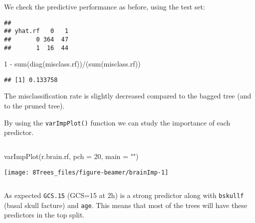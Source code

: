 \documentclass[
  10pt,
  ignorenonframetext,
]{beamer}
\newenvironment{Shaded}{\begin{snugshade}}{\end{snugshade}}
\newcommand{\AttributeTok}[1]{\textcolor[rgb]{0.77,0.63,0.00}{#1}}
\newcommand{\DecValTok}[1]{\textcolor[rgb]{0.00,0.00,0.81}{#1}}
\newcommand{\FunctionTok}[1]{\textcolor[rgb]{0.00,0.00,0.00}{#1}}
\newcommand{\NormalTok}[1]{#1}
\newcommand{\OtherTok}[1]{\textcolor[rgb]{0.56,0.35,0.01}{#1}}
\newcommand{\SpecialCharTok}[1]{\textcolor[rgb]{0.00,0.00,0.00}{#1}}
\newcommand{\StringTok}[1]{\textcolor[rgb]{0.31,0.60,0.02}{#1}}
\begin{document}
\begin{frame}[fragile]
We check the predictive performance as before, using the test set:

\vspace{2mm}

\scriptsize

\begin{Shaded}
\end{Shaded}

\begin{verbatim}
##        
## yhat.rf   0   1
##       0 364  47
##       1  16  44
\end{verbatim}

\begin{Shaded}
\begin{Highlighting}[]
\DecValTok{1} \SpecialCharTok{{-}} \FunctionTok{sum}\NormalTok{(}\FunctionTok{diag}\NormalTok{(misclass.rf))}\SpecialCharTok{/}\NormalTok{(}\FunctionTok{sum}\NormalTok{(misclass.rf))}
\end{Highlighting}
\end{Shaded}

\begin{verbatim}
## [1] 0.133758
\end{verbatim}

\normalsize

The misclassification rate is slightly decreased compared to the bagged
tree (and to the pruned tree).
\end{frame}

\begin{frame}[fragile]
By using the \texttt{varImpPlot()} function we can study the importance
of each predictor.

\(~\)

\scriptsize

\begin{Shaded}
\begin{Highlighting}[]
\FunctionTok{varImpPlot}\NormalTok{(r.brain.rf, }\AttributeTok{pch =} \DecValTok{20}\NormalTok{, }\AttributeTok{main =} \StringTok{""}\NormalTok{)}
\end{Highlighting}
\end{Shaded}

\begin{center}\texttt{[image: 8Trees\_files/figure-beamer/brainImp-1]} \end{center}

\normalsize

\(~\)

As expected \texttt{GCS.15} (GCS=15 at 2h) is a strong predictor along
with \texttt{bskullf} (basal skull facture) and \texttt{age}. This means
that most of the trees will have these predictors in the top split.
\end{frame}
\end{document}
